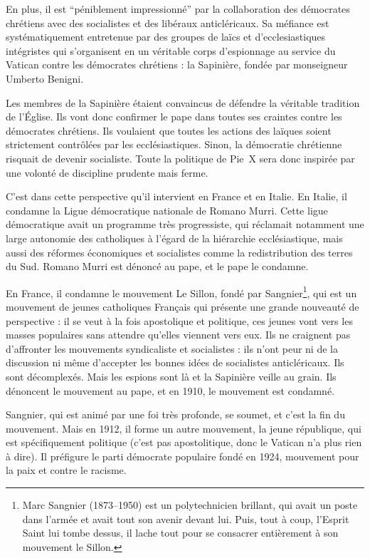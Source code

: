 \documentclass[12pt]{report}
\begin{document}
En plus, il est \enquote{péniblement impressionné} par la collaboration des démocrates chrétiens avec des socialistes et des libéraux anticléricaux.
Sa méfiance est systématiquement entretenue par des groupes de laïcs et d'ecclesiastiques intégristes qui s'organisent en un véritable corps d'espionnage au service du Vatican contre les démocrates chrétiens : la Sapinière, fondée par monseigneur Umberto Benigni.

Les membres de la Sapinière étaient convaincus de défendre la véritable tradition de l'Église. Ils vont donc confirmer le pape dans toutes ses craintes contre les démocrates chrétiens.
Ils voulaient que toutes les actions des laïques soient strictement contrôlées par les ecclésiastiques.
Sinon, la démocratie chrétienne risquait de devenir socialiste.
Toute la politique de Pie~X sera donc inspirée par une volonté de discipline prudente mais ferme.

C'est dans cette perspective qu'il intervient en France et en Italie. En Italie, il condamne la Ligue démocratique nationale de Romano Murri. Cette ligue démocratique avait un programme très progressiste, qui réclamait notamment une large autonomie des catholiques à l'égard de la hiérarchie ecclésiastique, mais aussi des réformes économiques et socialistes comme la redistribution des terres du Sud.
Romano Murri est dénoncé au pape, et le pape le condamne.

En France, il condamne le mouvement Le Sillon, fondé par Sangnier\footnote{Marc Sangnier (1873--1950) est un polytechnicien brillant, qui avait un poste dans l'armée et avait tout son avenir devant lui. Puis, tout à coup, l'Esprit Saint lui tombe dessus, il lache tout pour se consacrer entièrement à son mouvement le Sillon.}, qui est un mouvement de jeunes catholiques Français qui présente une grande nouveauté de perspective : il se veut à la fois apostolique et politique, ces jeunes vont vers les masses populaires sans attendre qu'elles viennent vers eux. 
Ils ne craignent pas d’affronter les
mouvements syndicaliste et socialistes : ils n’ont peur ni de la discussion ni même
d’accepter les bonnes idées de socialistes anticléricaux. Ils sont décomplexés.
Mais les espions sont là et la Sapinière veille au grain. Ils dénoncent le mouvement au pape, et en 1910, le mouvement est condamné.

Sangnier, qui est animé par une foi très profonde, se soumet, et c'est la fin du mouvement.
Mais en 1912, il forme un autre mouvement, la jeune république, qui est spécifiquement politique (c'est pas apostolitique, donc le Vatican n'a plus rien à dire). Il préfigure le parti démocrate populaire fondé en 1924, mouvement pour la paix et contre le racisme.
\end{document}
